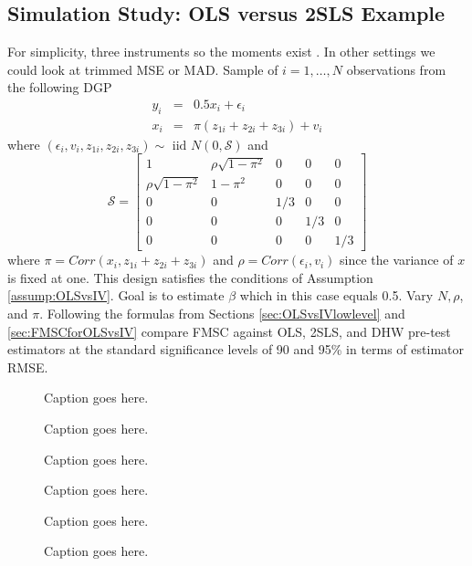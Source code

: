 \subsection{Simulation Study: OLS versus 2SLS Example}
For simplicity, three instruments so the moments exist \citep{Phillips1980}. 
In other settings we could look at trimmed MSE or MAD.
Sample of $i = 1, \hdots, N$ observations from the following DGP 
\begin{eqnarray}
	y_i &=& 0.5 x_i + \epsilon_i\\
	x_i &=& \pi(z_{1i} + z_{2i} + z_{3i}) + v_i
\end{eqnarray}
where $(\epsilon_i, v_i, z_{1i}, z_{2i}, z_{3i}) \sim \mbox{ iid } N(0, \mathcal{S})$ and
\begin{equation}
	\mathcal{S} = \left[ \begin{array}
		{ccccc} 
		1 & \rho \sqrt{1-\pi^2}& 0 & 0 & 0\\
		\rho\sqrt{1-\pi^2} & 1 - \pi^2 & 0 & 0 & 0\\
		0 & 0 & 1/3 & 0 & 0\\
		0 & 0 & 0 & 1/3 & 0 \\
		0 & 0 & 0 & 0 & 1/3
	\end{array}\right]
\end{equation}
where $\pi = Corr(x_i, z_{1i} + z_{2i} + z_{3i})$ and $\rho = Corr(\epsilon_i, v_i)$ since the variance of $x$ is fixed at one.
This design satisfies the conditions of Assumption \ref{assump:OLSvsIV}.
Goal is to estimate $\beta$ which in this case equals 0.5.
Vary $N, \rho$, and $\pi$.
Following the formulas from Sections \ref{sec:OLSvsIVlowlevel} and \ref{sec:FMSCforOLSvsIV} compare FMSC against OLS, 2SLS, and DHW pre-test estimators at the standard significance levels of 90 and 95\% in terms of estimator RMSE.

\begin{figure}
\centering
	
	\caption{Caption goes here.}
\end{figure}

\begin{figure}
\centering
	
	\caption{Caption goes here.}
\end{figure}

\begin{figure}
\centering
	
	\caption{Caption goes here.}
\end{figure}

\begin{figure}
\centering
	
	\caption{Caption goes here.}
\end{figure}

\begin{figure}
\centering
	
	\caption{Caption goes here.}
\end{figure}

\begin{figure}
\centering
	
	\caption{Caption goes here.}
\end{figure}